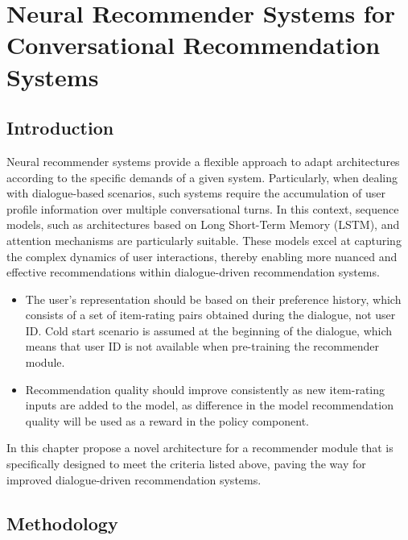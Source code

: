 \chapter{Neural Recommender Systems for Conversational Recommendation Systems}
\label{ch:recommender} %

\section{Introduction}

Neural recommender systems provide a flexible approach to adapt architectures according to the specific demands of a given system. Particularly, when dealing with dialogue-based scenarios, such systems require the accumulation of user profile information over multiple conversational turns. In this context, sequence models, such as architectures based on Long Short-Term Memory (LSTM), and attention mechanisms are particularly suitable. These models excel at capturing the complex dynamics of user interactions, thereby enabling more nuanced and effective recommendations within dialogue-driven recommendation systems. 

\begin{itemize}
    \item The user's representation should be based on their preference history, which consists of a set of item-rating pairs obtained during the dialogue, not user ID. Cold start scenario is assumed at the beginning of the dialogue, which means that user ID is not available when pre-training the recommender module.
    \item Recommendation quality should improve consistently as new item-rating inputs are added to the model, as difference in the model recommendation quality will be used as a reward in the policy component.
\end{itemize}

In this chapter propose a novel architecture for a recommender module that is specifically designed to meet the criteria listed above, paving the way for improved dialogue-driven recommendation systems.


\section{Methodology}
\label{ch:method} %

